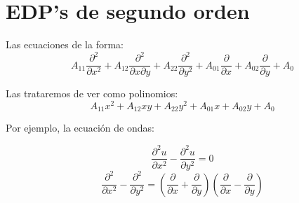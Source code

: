 \documentclass[openany]{book}
\begin{document}
\section{EDP's de segundo orden}

Las ecuaciones de la forma:
$$ A_{11} \dfrac{\partial ^2}{\partial x^2} + A_{12} \dfrac{\partial ^2}{\partial x \partial y} + A_{22} \dfrac{\partial ^2}{\partial y^2} +A_{01} \dfrac{\partial }{\partial x} + A_{02} \dfrac{\partial }{\partial y} + A_0 $$

Las trataremos de ver como polinomios:
$$ A_{11} x^2 + A_{12} xy + A_{22} y^2 +A_{01} x + A_{02} y + A_0 $$

Por ejemplo, la ecuación de ondas:

$$ \dfrac{\partial ^2u}{\partial x^2}- \dfrac{\partial ^2u}{\partial y^2} = 0 $$
$$ \dfrac{\partial ^2}{\partial x^2}- \dfrac{\partial ^2}{\partial y^2} = \left( \dfrac{\partial }{\partial x} + \dfrac{\partial }{\partial y} \right) \left( \dfrac{\partial }{\partial x}- \dfrac{\partial }{\partial y}  \right) $$
\end{document}
